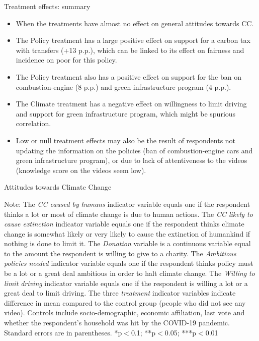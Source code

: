 \documentclass[aspectratio=169,9pt,dvipsnames]{beamer}
\begin{document}
\begin{frame}{Treatment effects: summary}
\begin{itemize}
    \item When the treatments have almost no effect on general attitudes towards CC.
    \item The Policy treatment has a large positive effect on support for a carbon tax with transfers (+13 p.p.), which can be linked to its effect on fairness and incidence on poor for this policy.
    \item The Policy treatment also has a positive effect on support for the ban on combustion-engine (8 p.p.) and green infrastructure program (4 p.p.).
    \item The Climate treatment has a negative effect on willingness to limit driving and support for green infrastructure program, which might be spurious correlation.
    \item Low or null treatment effects may also be the result of respondents not updating the information on the policies (ban of combustion-engine cars and green infrastructure program), or due to lack of attentiveness to the videos (knowledge score on the videos seem low). 
\end{itemize}
\end{frame}

\begin{frame}{}%
\begin{table}[h!]
\caption{Attitudes towards Climate Change}
\begin{center}
\scalebox{.59}{}
\end{center}
	{\tiny Note: The \textit{CC caused by humans} indicator variable equals one if the respondent thinks a lot or most of climate change is due to human actions. The \textit{CC likely to cause extinction} indicator variable equals one if the respondent thinks climate change is somewhat likely or very likely to cause the extinction of humankind if nothing is done to limit it. The \textit{Donation} variable is a continuous variable equal to the amount the respondent is willing to give to a charity. The \textit{Ambitious policies needed} indicator variable equals one if the respondent thinks policy must be a lot or a great deal ambitious in order to halt climate change. The \textit{Willing to limit driving} indicator variable equals one if the respondent is willing a lot or a great deal to limit driving. The three \textit{treatment} indicator variables indicate difference in mean compared to the control group (people who did not see any video). Controls include socio-demographic, economic affiliation, last vote and whether the respondent's household was hit by the COVID-19 pandemic. Standard errors are in parentheses.  *p$<$0.1; **p$<$0.05; ***p$<$0.01}
\end{table}
\end{frame}
\end{document}
